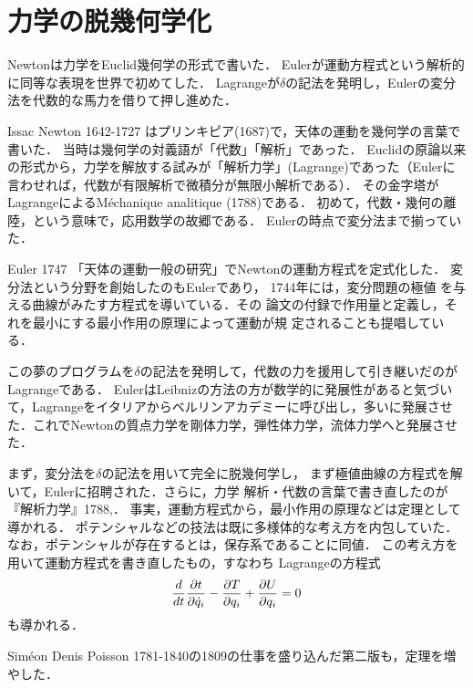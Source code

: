 \documentclass[uplatex, dvipdfmx]{jsreport}
\begin{document}
\section{力学の脱幾何学化}

\begin{tcolorbox}[colframe=ForestGreen, colback=ForestGreen!10!white,breakable,colbacktitle=ForestGreen!40!white,coltitle=black,fonttitle=\bfseries\sffamily,
title=]
    Newtonは力学をEuclid幾何学の形式で書いた．
    Eulerが運動方程式という解析的に同等な表現を世界で初めてした．
    Lagrangeが$\delta$の記法を発明し，Eulerの変分法を代数的な馬力を借りて押し進めた．
\end{tcolorbox}

\begin{history}[幾何学の時代]
    Issac Newton 1642-1727 はプリンキピア(1687)で，天体の運動を幾何学の言葉で書いた．
    当時は幾何学の対義語が「代数」「解析」であった．
    Euclidの原論以来の形式から，力学を解放する試みが「解析力学」(Lagrange)であった（Eulerに言わせれば，代数が有限解析で微積分が無限小解析である）．
    その金字塔がLagrangeによるMéchanique analitique (1788)である．
    初めて，代数・幾何の離陸，という意味で，応用数学の故郷である．
    Eulerの時点で変分法まで揃っていた．
\end{history}

\begin{history}
    Euler 1747 \cite{Euler1747}「天体の運動一般の研究」でNewtonの運動方程式を定式化した．
    変分法という分野を創始したのもEulerであり，
    1744年には，変分問題の極値
    を与える曲線がみたす方程式を導いている．その
    論文の付録で作用量と定義し，そ
    れを最小にする最小作用の原理によって運動が規
    定されることも提唱している．

    この夢のプログラムを$\delta$の記法を発明して，代数の力を援用して引き継いだのがLagrangeである．
    EulerはLeibnizの方法の方が数学的に発展性があると気づいて，Lagrangeをイタリアからベルリンアカデミーに呼び出し，多いに発展させた．これでNewtonの質点力学を剛体力学，弾性体力学，流体力学へと発展させた．
\end{history}

\begin{history}
    まず，変分法を$\delta$の記法を用いて完全に脱幾何学し，
    まず極値曲線の方程式を解いて，Eulerに招聘された．さらに，力学
    解析・代数の言葉で書き直したのが『解析力学』1788,\cite{Lagrange1788}．
    事実，運動方程式から，最小作用の原理などは定理として導かれる．
    ポテンシャルなどの技法は既に多様体的な考え方を内包していた．なお，ポテンシャルが存在するとは，保存系であることに同値．
    この考え方を用いて運動方程式を書き直したもの，すなわち
    Lagrangeの方程式
    \[\frac{d }{d t}\frac{\partial t}{\partial \dot{q}_i}-\frac{\partial T}{\partial q_i}+\frac{\partial U}{\partial q_i}=0\]
    も導かれる．

    Siméon Denis Poisson 1781-1840の1809の仕事を盛り込んだ第二版も，定理を増やした．
\end{history}
\end{document}
